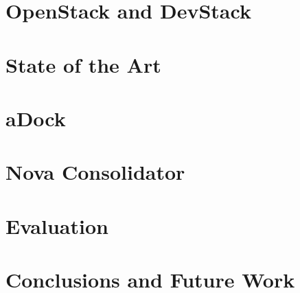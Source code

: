 \documentclass[12pt,a4paper,twoside,openright]{report}
\begin{document}
\chapter{OpenStack and DevStack}
\label{chap:openstack_devstack}


\chapter{State of the Art}
\label{chap:sota}


\chapter{aDock}
\label{chap:adock}


\chapter{Nova Consolidator}
\label{chap:consolidator}


\chapter{Evaluation}
\label{chap:eval}


\chapter{Conclusions and Future Work}
\label{chap:conclusions}





\end{document}
